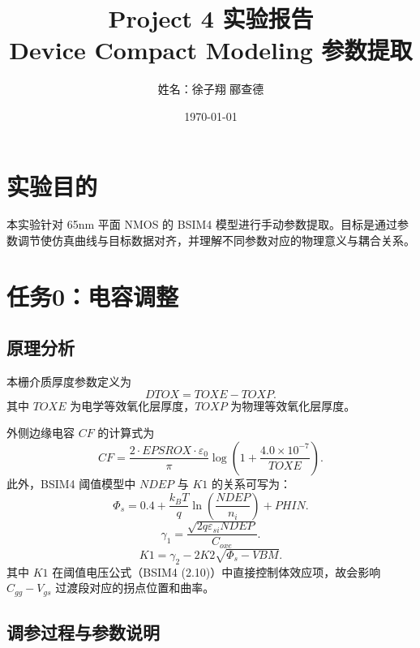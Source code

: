 \documentclass[12pt, a4paper, UTF8]{article}
\title{Project 4 实验报告\\Device Compact Modeling 参数提取}
\author{姓名：徐子翔 \quad 郦查德}
\date{\today}
\begin{document}
\maketitle

\section{实验目的}
本实验针对 65nm 平面 NMOS 的 BSIM4 模型进行手动参数提取。目标是通过参数调节使仿真曲线与目标数据对齐，并理解不同参数对应的物理意义与耦合关系。


\section{任务0：电容调整}

\subsection{原理分析}
本栅介质厚度参数定义为
\begin{equation}
	DTOX=TOXE-TOXP.
\end{equation}
其中 \(TOXE\) 为电学等效氧化层厚度，\(TOXP\) 为物理等效氧化层厚度。

外侧边缘电容 \(CF\) 的计算式为
\begin{equation}
	CF=\frac{2\cdot EPSROX\cdot\varepsilon_0}{\pi}\log\left(1+\frac{4.0\times10^{-7}}{TOXE}\right). \tag{BSIM4 (7.86)}
\end{equation}
此外，BSIM4 阈值模型中 \(NDEP\) 与 \(K1\) 的关系可写为：
\begin{equation}
	\Phi_s = 0.4 + \frac{k_B T}{q}\ln\left(\frac{NDEP}{n_i}\right) + PHIN. \tag{BSIM4 (2.11)}
\end{equation}
\begin{equation}
	\gamma_1 = \frac{\sqrt{2 q \varepsilon_{si} NDEP}}{C_{oxe}}. \tag{BSIM4 (2.15)}
\end{equation}
\begin{equation}
	K1 = \gamma_2 - 2K2\sqrt{\Phi_s - VBM}. \tag{BSIM4 (2.13)}
\end{equation}
其中 \(K1\) 在阈值电压公式（BSIM4 (2.10)）中直接控制体效应项，故会影响 \(C_{gg}-V_{gs}\) 过渡段对应的拐点位置和曲率。

\subsection{调参过程与参数说明}
\end{document}
